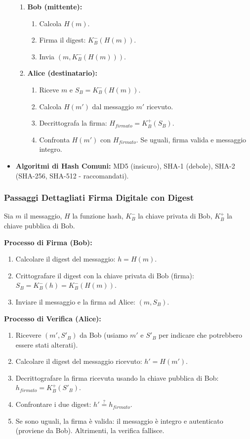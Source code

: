\begin{itemize}
\begin{enumerate}
        \item \textbf{Bob (mittente):}
        \begin{enumerate}
            \item Calcola $H(m)$.
            \item Firma il digest: $K_B^-(H(m))$.
            \item Invia $(m, K_B^-(H(m)))$.
        \end{enumerate}
        \item \textbf{Alice (destinatario):}
        \begin{enumerate}
            \item Riceve $m$ e $S_B = K_B^-(H(m))$.
            \item Calcola $H(m')$ dal messaggio $m'$ ricevuto.
            \item Decrittografa la firma: $H_{firmato} = K_B^+(S_B)$.
            \item Confronta $H(m')$ con $H_{firmato}$. Se uguali, firma valida e messaggio integro.
        \end{enumerate}
    \end{enumerate}
    \item \textbf{Algoritmi di Hash Comuni:} MD5 (insicuro), SHA-1 (debole), SHA-2 (SHA-256, SHA-512 - raccomandati).
\end{itemize}

\subsubsection{Passaggi Dettagliati Firma Digitale con Digest}
\label{ssubsec:firma_digest_dettagli}
Sia $m$ il messaggio, $H$ la funzione hash, $K_B^-$ la chiave privata di Bob, $K_B^+$ la chiave pubblica di Bob.

\textbf{Processo di Firma (Bob):}
\begin{enumerate}
    \item Calcolare il digest del messaggio: $h = H(m)$.
    \item Crittografare il digest con la chiave privata di Bob (firma): $S_B = K_B^-(h) = K_B^-(H(m))$.
    \item Inviare il messaggio e la firma ad Alice: $(m, S_B)$.
\end{enumerate}

\textbf{Processo di Verifica (Alice):}
\begin{enumerate}
    \item Ricevere $(m', S'_B)$ da Bob (usiamo $m'$ e $S'_B$ per indicare che potrebbero essere stati alterati).
    \item Calcolare il digest del messaggio ricevuto: $h' = H(m')$.
    \item Decrittografare la firma ricevuta usando la chiave pubblica di Bob: $h_{firmato} = K_B^+(S'_B)$.
    \item Confrontare i due digest: $h' \stackrel{?}{=} h_{firmato}$.
    \item Se sono uguali, la firma è valida: il messaggio è integro e autenticato (proviene da Bob). Altrimenti, la verifica fallisce.
\end{enumerate}

